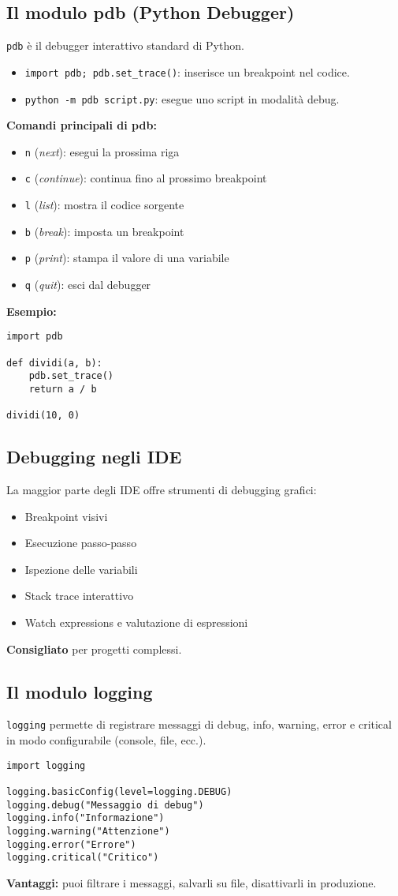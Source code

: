 \documentclass[a4paper,12pt]{article}
\begin{document}
\subsection*{Il modulo pdb (Python Debugger)}
\texttt{pdb} è il debugger interattivo standard di Python.
\begin{itemize}
    \item \verb|import pdb; pdb.set_trace()|: inserisce un breakpoint nel codice.
    \item \verb|python -m pdb script.py|: esegue uno script in modalità debug.
\end{itemize}
\textbf{Comandi principali di pdb:}
\begin{itemize}
    \item \texttt{n} (\textit{next}): esegui la prossima riga
    \item \texttt{c} (\textit{continue}): continua fino al prossimo breakpoint
    \item \texttt{l} (\textit{list}): mostra il codice sorgente
    \item \texttt{b} (\textit{break}): imposta un breakpoint
    \item \texttt{p} (\textit{print}): stampa il valore di una variabile
    \item \texttt{q} (\textit{quit}): esci dal debugger
\end{itemize}
\textbf{Esempio:}
\begin{lstlisting}
import pdb

def dividi(a, b):
    pdb.set_trace()
    return a / b

dividi(10, 0)
\end{lstlisting}

\subsection*{Debugging negli IDE}
La maggior parte degli IDE offre strumenti di debugging grafici:
\begin{itemize}
    \item Breakpoint visivi
    \item Esecuzione passo-passo
    \item Ispezione delle variabili
    \item Stack trace interattivo
    \item Watch expressions e valutazione di espressioni
\end{itemize}
\textbf{Consigliato} per progetti complessi.

\subsection*{Il modulo logging}
\texttt{logging} permette di registrare messaggi di debug, info, warning, error e critical in modo configurabile (console, file, ecc.).
\begin{lstlisting}
import logging

logging.basicConfig(level=logging.DEBUG)
logging.debug("Messaggio di debug")
logging.info("Informazione")
logging.warning("Attenzione")
logging.error("Errore")
logging.critical("Critico")
\end{lstlisting}
\textbf{Vantaggi:} puoi filtrare i messaggi, salvarli su file, disattivarli in produzione.
\end{document}

